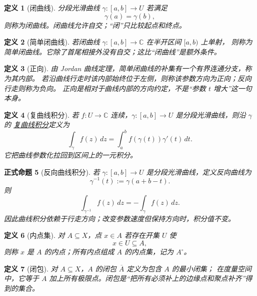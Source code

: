 \documentclass[UTF8,fontset=none,a4paper,11pt]{ctexart}
\theoremstyle{foundation-definition}
\newtheorem{definition}{定义}[section]
\theoremstyle{foundation-theorem}
\theoremstyle{foundation-proposition}
\newtheorem{proposition}[definition]{正式命题}
\theoremstyle{foundation-example}
\theoremstyle{foundation-remark}
\theoremstyle{foundation-theorem}
\newcommand{\C}{\mathbb C}
\newcommand{\term}[2]{\hyperref[#1]{#2}}
\begin{document}
\begin{definition}[闭曲线]\label{def:complex-closed-curve}
分段光滑曲线 \(\gamma:[a,b]\to U\) 若满足
\[
\gamma(a)=\gamma(b),
\]
则称为闭曲线。闭曲线允许自交；“闭”只比较起点和终点。
\end{definition}

\begin{definition}[简单闭曲线]\label{def:simple-closed-curve}
若闭曲线 \(\gamma:[a,b]\to\mathbb C\) 在半开区间 \([a,b)\) 上单射，
则称为简单闭曲线。它除了首尾相接外没有自交；这比“闭曲线”是额外条件。
\end{definition}

\begin{definition}[正向]\label{def:positive-orientation}
由 Jordan 曲线定理，简单闭曲线的补集有一个有界连通分支，称为其内部。
若沿曲线行走时该内部始终位于左侧，则称该参数方向为正向；反向行走则称为负向。
正向是相对于曲线内部的方向约定，不是“参数 \(t\) 增大”这一句本身。
\end{definition}

\begin{definition}[复曲线积分]\label{def:complex-line-integral}
若 \(f:U\to\C\) 连续，\(\gamma:[a,b]\to U\) 是分段光滑曲线，则沿 \(\gamma\) 的
\term{def:complex-line-integral}{复曲线积分}定义为
\[
\int_\gamma f(z)\,dz
=\int_a^b f(\gamma(t))\gamma'(t)\,dt.
\]
它把曲线参数化拉回到区间上的一元积分。
\end{definition}

\begin{proposition}[反向曲线积分]\label{prop:reverse-curve-integral}
若 \(\gamma:[a,b]\to U\) 是分段光滑曲线，定义反向曲线为
\[
\gamma^{-1}(t):=\gamma(a+b-t).
\]
则
\[
\int_{\gamma^{-1}}f(z)\,dz=-\int_\gamma f(z)\,dz.
\]
因此曲线积分依赖于行走方向；改变参数速度但保持方向时，积分值不变。
\end{proposition}

\begin{definition}[内点集]\label{def:interior}
对 \(A\subseteq X\)，点 \(x\in A\) 若存在开集 \(U\) 使
\[
x\in U\subseteq A,
\]
则称 \(x\) 是 \(A\) 的内点；所有内点组成 \(A\) 的内点集，记为 \(A^\circ\)。
\end{definition}

\begin{definition}[闭包]\label{def:closure}
对 \(A\subseteq X\)，\(A\) 的闭包 \(\overline A\) 定义为包含 \(A\) 的最小闭集；
在度量空间中，它等于 \(A\) 加上所有极限点。闭包是“把所有必须补上的边缘点和聚点补齐”得到的集合。
\end{definition}
\end{document}
